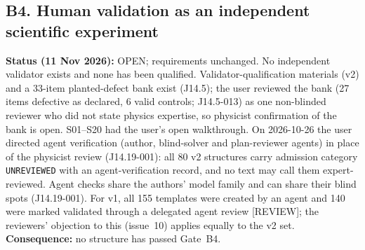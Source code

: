 \documentclass[10pt,a4paper]{article}
\newcommand{\tg}[1]{\textsc{[#1]}}
\begin{document}
\subsection{B4. Human validation as an independent scientific experiment}\label{sec:phaseB-B4}

\textbf{Status (11 Nov 2026):} OPEN; requirements unchanged. No independent validator exists and none has been
qualified. Validator-qualification materials (v2) and a 33-item planted-defect bank exist (J14.5); the user
reviewed the bank (27 items defective as declared, 6 valid controls; J14.5-013) as one non-blinded reviewer who
did not state physics expertise, so physicist confirmation of the bank is open. S01--S20 had the user's open
walkthrough. On 2026-10-26 the user directed agent verification (author, blind-solver and plan-reviewer agents)
in place of the physicist review (J14.19-001): all 80 v2 structures carry admission category
\texttt{UNREVIEWED} with an agent-verification record, and no text may call them expert-reviewed. Agent checks
share the authors' model family and can share their blind spots (J14.19-001). For v1, all 155 templates were
created by an agent and 140 were marked validated through a delegated agent review \tg{REVIEW}; the reviewers'
objection to this (issue~10) applies equally to the v2 set. \textbf{Consequence:} no structure has passed Gate~B4.
\end{document}

